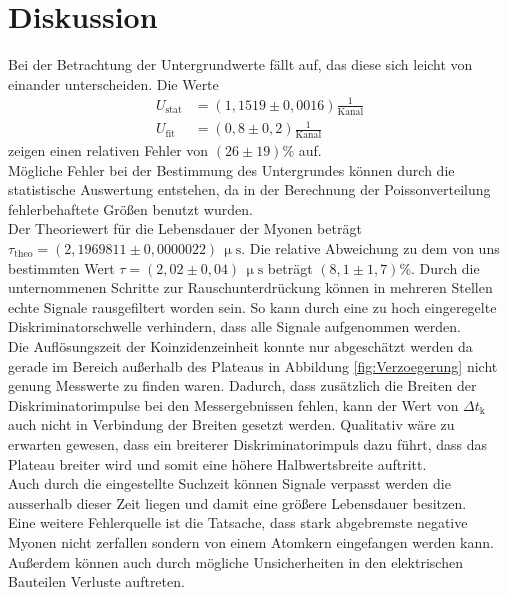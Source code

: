 \section{Diskussion}
\label{sec:Diskussion}
Bei der Betrachtung der Untergrundwerte fällt auf, das diese sich leicht von einander unterscheiden.
Die Werte
\begin{align*}
  U_{\text{stat}}&=(1,1519\pm0,0016)\frac{1}{\text{Kanal}}\\
  U_{\text{fit}}&=(0,8 \pm 0,2) \frac{1}{\text{Kanal}}
\end{align*}
zeigen einen relativen Fehler von $(26\pm19)\%$ auf.\\
Mögliche Fehler bei der Bestimmung des Untergrundes können durch die statistische Auswertung entstehen, da in der Berechnung der
Poissonverteilung fehlerbehaftete Größen benutzt wurden.\\
Der Theoriewert für die Lebensdauer der Myonen beträgt $\tau_{\text{theo}}=(2,1969811\pm0,0000022)\,\upmu\text{s}$\cite{Lebensdauer}.
Die relative Abweichung zu dem von uns bestimmten Wert $\tau=(2,02\pm0,04)\,\upmu\text{s}$ beträgt $(8,1\pm1,7)\%$.
Durch die unternommenen Schritte zur Rauschunterdrückung können in mehreren Stellen echte Signale rausgefiltert worden sein.
So kann durch eine zu hoch eingeregelte Diskriminatorschwelle verhindern, dass alle Signale aufgenommen werden.\\
Die Auflösungszeit der Koinzidenzeinheit konnte nur abgeschätzt werden da gerade im Bereich außerhalb des Plateaus
in Abbildung \ref{fig:Verzoegerung} nicht genung Messwerte zu finden waren.
Dadurch, dass zusätzlich die Breiten der Diskriminatorimpulse bei den Messergebnissen fehlen,
kann der Wert von $\Delta t_\text{k}$ auch nicht in Verbindung der Breiten gesetzt werden.
Qualitativ wäre zu erwarten gewesen, dass ein breiterer Diskriminatorimpuls dazu führt, dass das Plateau
breiter wird und somit eine höhere Halbwertsbreite auftritt.\\
Auch durch die eingestellte Suchzeit können Signale verpasst werden die ausserhalb dieser Zeit liegen und damit eine größere
Lebensdauer besitzen.\\
Eine weitere Fehlerquelle ist die Tatsache, dass stark abgebremste negative Myonen nicht zerfallen
sondern von einem Atomkern eingefangen werden kann.\\
Außerdem können auch durch mögliche Unsicherheiten in den elektrischen Bauteilen Verluste auftreten.\\
